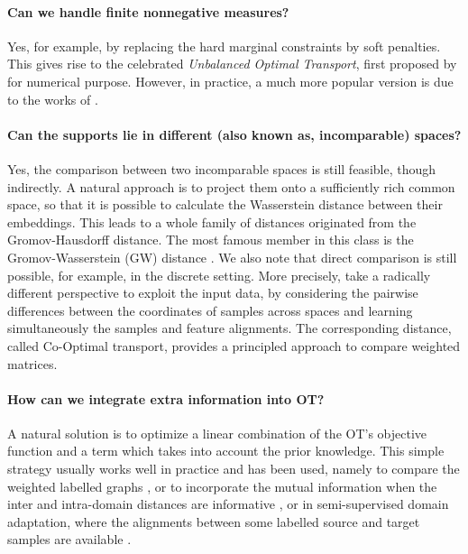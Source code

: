 \paragraph{Can we handle finite nonnegative measures?} Yes, for example,
by replacing the hard marginal constraints by soft penalties.
This gives rise to the celebrated \textit{Unbalanced Optimal Transport}, first proposed by
\citet{Benamou03} for numerical purpose. However, in practice, a much more popular version
is due to the works of \citet{Liero18,Frogner15}.

\paragraph{Can the supports lie in different (also known as, incomparable) spaces?}
Yes, the comparison between two incomparable spaces is still feasible, though indirectly.
A natural approach is to project them onto a sufficiently rich common space,
so that it is possible to calculate the Wasserstein distance between their embeddings.
This leads to a whole family of distances originated from the Gromov-Hausdorff distance.
The most famous member in this class is the Gromov-Wasserstein (GW) distance \citep{Memoli07,Memoli11}.
We also note that direct comparison is still possible, for example, in the discrete setting.
More precisely, \citet{Redko20} take a radically different perspective
to exploit the input data, by considering the pairwise differences between the coordinates
of samples across spaces and learning simultaneously the samples and feature alignments.
The corresponding distance, called Co-Optimal transport,
provides a principled approach to compare weighted matrices.

\paragraph{How can we integrate extra information into OT?} A natural solution is to optimize
a linear combination of the OT's objective function and a term which takes into account the
prior knowledge. This simple strategy usually works well in practice and has been used, namely to
compare the weighted labelled graphs \citep{Vayer19b}, or to incorporate the mutual information
when the inter and intra-domain distances are informative \citep{Chuang23},
or in semi-supervised domain adaptation, where the alignments between some labelled source
and target samples are available \citep{Courty16,Gu22}.


